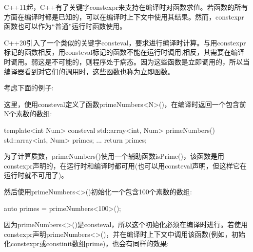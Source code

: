 
C++11起，C++有了关键字constexpr来支持在编译时对函数求值。若函数的所有方面在编译时都是已知的，可以在编译时上下文中使用其结果。然而，constexpr函数也可以作为“普通”运行时函数使用。

C++20引入了一个类似的关键字consteval，要求进行编译时计算。与用constexpr标记的函数相反，用consteval标记的函数不能在运行时调用;相反，其需要在编译时调用。弱这是不可能的，则程序处于病态。因为这些函数是立即调用的，所以当编译器看到对它们的调用时，这些函数也称为立即函数。


考虑下面的例子:



这里，使用consteval定义了函数primeNumbers<N>()，在编译时返回一个包含前N个素数的数组:

\begin{cpp}
template<int Num>
consteval
std::array<int, Num> primeNumbers()
{
	std::array<int, Num> primes;
	...
	return primes;
}
\end{cpp}

为了计算质数，primeNumbers()使用一个辅助函数isPrime()，该函数是用constexpr声明的，在运行时和编译时都可用(也可以用consteval声明，但这样它在运行时就不可用了)。

然后使用primeNumbers<>()初始化一个包含100个素数的数组:

\begin{cpp}
auto primes = primeNumbers<100>();
\end{cpp}

因为primeNumbers<>()是consteval，所以这个初始化必须在编译时进行。若使用constexpr声明primeNumbers<>()，并在编译时上下文中调用该函数(例如，初始化constexpr或constinit数组prime)，也会有同样的效果:

